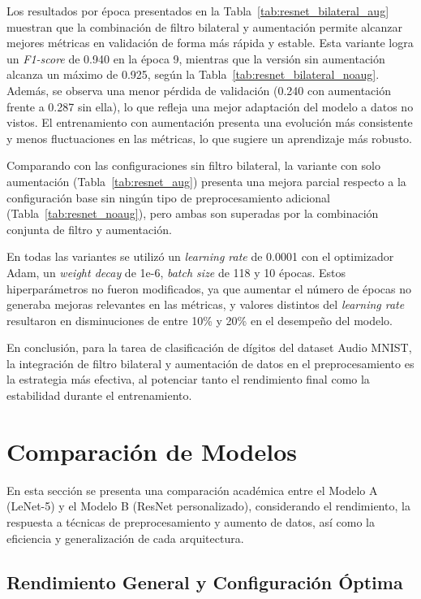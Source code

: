 \documentclass[conference]{IEEEtran}
\begin{document}
Los resultados por época presentados en la Tabla~\ref{tab:resnet_bilateral_aug} muestran que la combinación de filtro bilateral y aumentación permite alcanzar mejores métricas en validación de forma más rápida y estable. Esta variante logra un \emph{F1-score} de 0.940 en la época 9, mientras que la versión sin aumentación alcanza un máximo de 0.925, según la Tabla~\ref{tab:resnet_bilateral_noaug}. Además, se observa una menor pérdida de validación (0.240 con aumentación frente a 0.287 sin ella), lo que refleja una mejor adaptación del modelo a datos no vistos. El entrenamiento con aumentación presenta una evolución más consistente y menos fluctuaciones en las métricas, lo que sugiere un aprendizaje más robusto.

Comparando con las configuraciones sin filtro bilateral, la variante con solo aumentación (Tabla~\ref{tab:resnet_aug}) presenta una mejora parcial respecto a la configuración base sin ningún tipo de preprocesamiento adicional (Tabla~\ref{tab:resnet_noaug}), pero ambas son superadas por la combinación conjunta de filtro y aumentación.

En todas las variantes se utilizó un \emph{learning rate} de 0.0001 con el optimizador Adam, un \emph{weight decay} de 1e-6, \emph{batch size} de 118 y 10 épocas. Estos hiperparámetros no fueron modificados, ya que aumentar el número de épocas no generaba mejoras relevantes en las métricas, y valores distintos del \emph{learning rate} resultaron en disminuciones de entre 10\% y 20\% en el desempeño del modelo.

En conclusión, para la tarea de clasificación de dígitos del dataset Audio MNIST, la integración de filtro bilateral y aumentación de datos en el preprocesamiento es la estrategia más efectiva, al potenciar tanto el rendimiento final como la estabilidad durante el entrenamiento.

\section{Comparación de Modelos}

En esta sección se presenta una comparación académica entre el Modelo A (LeNet-5) y el Modelo B (ResNet personalizado), considerando el rendimiento, la respuesta a técnicas de preprocesamiento y aumento de datos, así como la eficiencia y generalización de cada arquitectura.

\subsection{Rendimiento General y Configuración Óptima}
\end{document}
